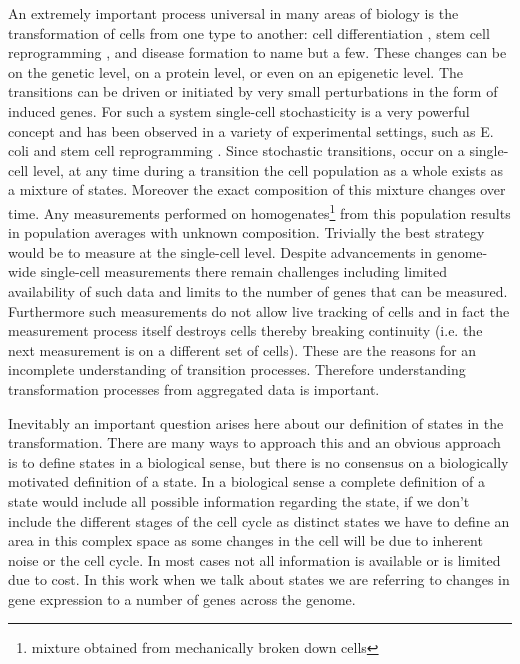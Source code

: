 An extremely important process universal in many areas of biology is the transformation of cells from one type to another: cell differentiation \citep{Tang:2010ed, Vierbuchen:2010fa}, stem cell reprogramming \citep{Takahashi:2006hi, Hanna:2010jy}, and disease formation \citep{Hannah:2000wo, Vogel:2010jb} to name but a few. These changes can be on the genetic level, on a protein level, or even on an epigenetic level. The transitions can be driven or initiated by very small perturbations in the form of induced genes. For such a system single-cell stochasticity is a very powerful concept and has been observed in a variety of experimental settings, such as E. coli  \citep{Elowitz:2002hb} and stem cell reprogramming \citep{Hanna:2009ix}. Since stochastic transitions, occur on a single-cell level, at any time during a transition the cell population as a whole exists as a mixture of states. Moreover the exact composition of this mixture changes over time. Any measurements performed on homogenates\footnote{mixture obtained from mechanically broken down cells} from this population results in population averages with unknown composition. Trivially the best strategy would be to measure at the single-cell level. Despite advancements in genome-wide single-cell measurements \citep{deSouza:2012dz, Tang:2011gt} there remain challenges including limited availability of such data and limits to the number of genes that can be measured. Furthermore such measurements do not allow live tracking of cells and in fact the measurement process itself destroys cells thereby breaking continuity (i.e. the next measurement is on a different set of cells). These are the reasons for an incomplete understanding of transition processes. Therefore understanding transformation processes from aggregated data is important.

Inevitably an important question arises here about our definition of states in the transformation. There are many ways to approach this and an obvious approach is to define states in a biological sense, but there is no consensus on a biologically motivated definition of a state. In a biological sense a complete definition of a state would include all possible information regarding the state, if we don't include the different stages of the cell cycle as distinct states we have to define an area in this complex space as some changes in the cell will be due to inherent noise or the cell cycle. In most cases not all information is available or is limited due to cost. In this work when we talk about states we are referring to changes in gene expression to a number of genes across the genome.

